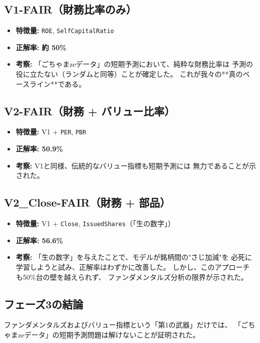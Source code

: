 \documentclass[a4paper, 11pt]{ltjsarticle}
\begin{document}
\subsection*{V1-FAIR（財務比率のみ）}
\begin{itemize}
    \item \textbf{特徴量:} \texttt{ROE}, \texttt{SelfCapitalRatio}
    \item \textbf{正解率: 約 50\%}
    \item \textbf{考察:} 「ごちゃまzeデータ」の短期予測において、純粋な財務比率は
    予測の役に立たない（ランダムと同等）ことが確定した。
    これが我々の**真のベースライン**である。
\end{itemize}

\subsection*{V2-FAIR（財務 + バリュー比率）}
\begin{itemize}
    \item \textbf{特徴量:} V1 + \texttt{PER}, \texttt{PBR}
    \item \textbf{正解率: 50.9\%}
    \item \textbf{考察:} V1と同様、伝統的なバリュー指標も短期予測には
    無力であることが示された。
\end{itemize}

\subsection*{V2\_Close-FAIR（財務 + 部品）}
\begin{itemize}
    \item \textbf{特徴量:} V1 + \texttt{Close}, \texttt{IssuedShares}（「生の数字」）
    \item \textbf{正解率: 56.6\%}
    \item \textbf{考察:} 「生の数字」を与えたことで、モデルが銘柄間の"さじ加減"を
    必死に学習しようと試み、正解率はわずかに改善した。
    しかし、このアプローチも50\%台の壁を越えられず、
    ファンダメンタルズ分析の限界が示された。
\end{itemize}

\subsection*{フェーズ3の結論}
ファンダメンタルズおよびバリュー指標という「第1の武器」だけでは、
「ごちゃまzeデータ」の短期予測問題は解けないことが証明された。
\end{document}
